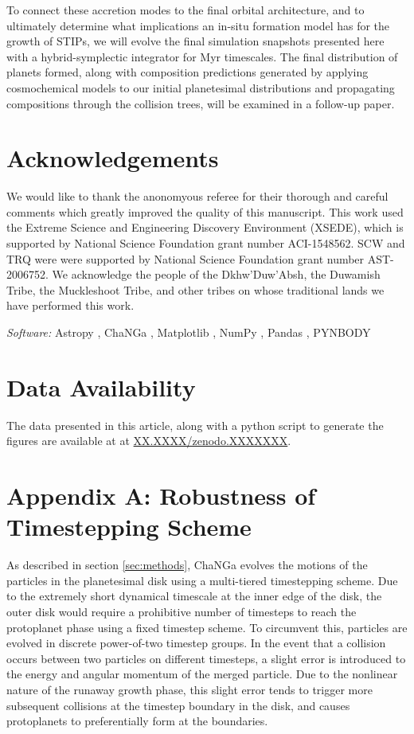 \documentclass[twocolumn,linenumbers]{aastex63}
\begin{document}
To connect these accretion modes to the final orbital architecture,
and to ultimately determine what implications an in-situ formation model has for the growth of STIPs, we will evolve the final 
simulation snapshots presented here with a hybrid-symplectic integrator for Myr timescales. The final distribution of planets 
formed, along with composition predictions generated by applying cosmochemical models to our initial planetesimal distributions 
and propagating compositions through the collision trees, will be examined in a follow-up paper.

\section*{Acknowledgements}
We would like to thank the anonomyous referee for their thorough and careful comments which greatly improved the quality of this manuscript. This work used the Extreme Science and Engineering Discovery Environment (XSEDE), which is supported by National Science Foundation grant number ACI-1548562. SCW and TRQ were were supported by National Science Foundation grant number AST-2006752. We acknowledge the people of the Dkhw’Duw’Absh, the Duwamish Tribe, the Muckleshoot Tribe, and other tribes on whose traditional lands we have performed this work.

\textit{Software:} Astropy \citep{astropy13}, {\sc ChaNGa} \citep{jetley08, menon15}, Matplotlib 
\citep{matplotlib07}, NumPy \citep{numpy11}, Pandas \citep{pandas10}, {\sc PYNBODY} \citep{pynbody13}

\section*{Data Availability}
The data presented in this article, along with a python script to generate the figures are available at at \url{XX.XXXX/zenodo.XXXXXXX}.


\appendix

\section{Appendix A: Robustness of Timestepping Scheme}\label{sec:rung_ecc}

As described in section \ref{sec:methods}, {\sc ChaNGa}
  evolves the motions of the particles in the planetesimal disk using
  a multi-tiered timestepping scheme. Due to the extremely short
  dynamical timescale at the inner edge of the disk, the outer disk
  would require a prohibitive number of timesteps to reach the
  protoplanet phase using a fixed timestep scheme.  To circumvent this, particles are evolved in discrete power-of-two timestep groups. In the event that a collision occurs between two particles on different timesteps, a slight error is introduced to the energy and angular momentum of the merged particle. Due to the nonlinear nature of the runaway growth phase, this slight error tends to trigger more subsequent collisions at the timestep boundary in the disk, and causes protoplanets to preferentially form at the boundaries.
\end{document}
